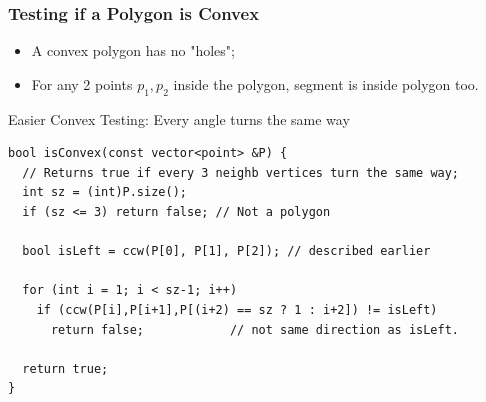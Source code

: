 \begin{frame}[fragile]
  \frametitle{Testing if a Polygon is Convex}
  \begin{itemize}
    \item A convex polygon has no "holes";
    \item For any 2 points $p_1,p_2$ inside the polygon, segment is inside polygon too.
  \end{itemize}

    {\smaller
    \begin{exampleblock}{Easier Convex Testing: Every angle turns the same way}
\begin{verbatim}
bool isConvex(const vector<point> &P) {
  // Returns true if every 3 neighb vertices turn the same way;
  int sz = (int)P.size();
  if (sz <= 3) return false; // Not a polygon

  bool isLeft = ccw(P[0], P[1], P[2]); // described earlier

  for (int i = 1; i < sz-1; i++)
    if (ccw(P[i],P[i+1],P[(i+2) == sz ? 1 : i+2]) != isLeft)
      return false;            // not same direction as isLeft.

  return true;
}
\end{verbatim}
    \end{exampleblock}
  }
\end{frame}

